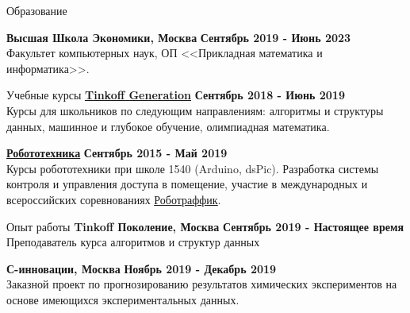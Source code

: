 \documentclass{resume} %
\begin{document}
\begin{rSection}{Образование}

{\bf Высшая Школа Экономики, Москва} \hfill {\bf Сентябрь 2019 - Июнь 2023} \\ 
Факультет компьютерных наук, ОП <<Прикладная математика и информатика>>.

\end{rSection}

\begin{rSection}{Учебные курсы}
{\bf \href{http://github.com/kik0s/tink}{\underline{Tinkoff Generation}}} \hfill {\bf Сентябрь 2018 - Июнь 2019} \\
Курсы для школьников по следующим направлениям: алгоритмы и структуры данных, машинное и глубокое обучение, олимпиадная математика.

{\bf \href{http://github.com/it-church/rbtrf-2018}{\underline{Робототехника}}} \hfill {\bf Сентябрь 2015 - Май 2019} \\
Курсы робототехники при школе 1540 (Arduino, dsPic). Разработка системы контроля и управления доступа в помещение, участие в международных и всероссийских соревнованиях
\href{https://wroboto.ru/rules/robotraffic/}{\underline{Роботраффик}}.


\end{rSection}

\begin{rSection}{Опыт работы}
{\bf Tinkoff Поколение, Москва} \hfill {\bf Сентябрь 2019 - Настоящее время} \\ 
Преподаватель курса алгоритмов и структур данных

{\bf С-инновации, Москва} \hfill {\bf Ноябрь 2019 - Декабрь 2019} \\ 
Заказной проект по прогнозированию результатов химических экспериментов на основе имеющихся экспериментальных данных.
\end{rSection}
\end{document}
